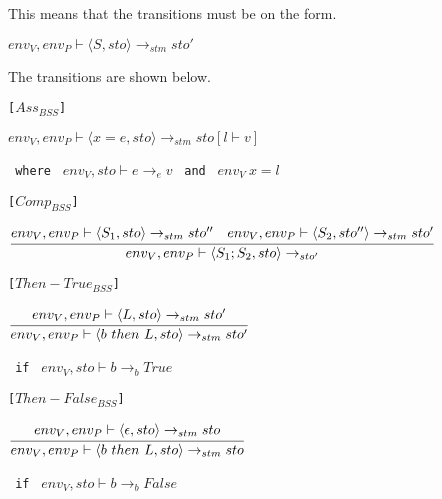{This means that the transitions must be on the form.

\begin{center}
	\begin{math}
		{env_V, env_P \vdash \langle S, sto \rangle \rightarrow_{stm} sto'}
	\end{math}
\end{center}

The transitions are shown below.

\texttt{[$Ass_{BSS}$]}\\
\begin{center}
	\begin{math}
		{env_V, env_P \vdash \langle x = e, sto \rangle \rightarrow_{stm} sto[l \vdash v]}
	\end{math}
	
	\texttt{ where } $env_V, sto \vdash e \rightarrow_e v$
	\texttt{ and } $env_V\ x = l$
\end{center}

\texttt{[$Comp_{BSS}$]}\\
\begin{center}
	\begin{math}
		\cfrac
			{env_V, env_P \vdash \langle S_1, sto \rangle \rightarrow_{stm} sto'' \quad env_V, env_P \vdash \langle S_2, sto'' \rangle \rightarrow_{stm} sto'}
			{env_V, env_P \vdash \langle S_1; S_2, sto \rangle \rightarrow_{sto'}}
	\end{math}
\end{center}

\texttt{[$Then-True_{BSS}$]}\\
\begin{center}
	\begin{math}
		\cfrac
			{env_V, env_P \vdash \langle L,sto \rangle \rightarrow_{stm} sto'}
			{env_V, env_P \vdash \langle b\ then\ L, sto \rangle \rightarrow_{stm} sto'}
	\end{math}
	
	\texttt{ if } $env_V, sto \vdash b \rightarrow_b True$
\end{center}

\texttt{[$Then-False_{BSS}$]}\\
\begin{center}
	\begin{math}
	\cfrac
	{env_V, env_P \vdash \langle \epsilon,sto \rangle \rightarrow_{stm} sto}
	{env_V, env_P \vdash \langle b\ then\ L, sto \rangle \rightarrow_{stm} sto}
	\end{math}
	
	\texttt{ if } $env_V, sto \vdash b \rightarrow_b False$
\end{center}

}
